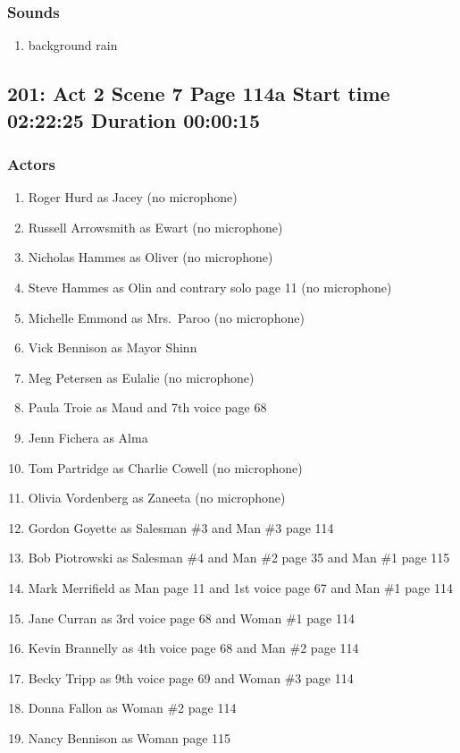 \subsubsection{Sounds}
\begin{enumerate}
\item background rain
\end{enumerate}
\subsection{201: Act 2 Scene 7 Page 114a Start time 02:22:25 Duration 00:00:15}

\subsubsection{Actors}
\begin{enumerate}
\item Roger Hurd as Jacey (no microphone)
\item Russell Arrowsmith as Ewart (no microphone)
\item Nicholas Hammes as Oliver (no microphone)
\item Steve Hammes as Olin and contrary solo page 11 (no microphone)
\item Michelle Emmond as Mrs.~Paroo (no microphone)
\item Vick Bennison as Mayor Shinn
\item Meg Petersen as Eulalie (no microphone)
\item Paula Troie as Maud and 7th voice page 68
\item Jenn Fichera as Alma
\item Tom Partridge as Charlie Cowell (no microphone)
\item Olivia Vordenberg as Zaneeta (no microphone)
\item Gordon Goyette as Salesman \#3 and Man \#3 page 114
\item Bob Piotrowski as Salesman \#4 and Man \#2 page 35 and Man \#1 page 115
\item Mark Merrifield as Man page 11 and 1st voice page 67 and Man \#1 page 114
\item Jane Curran as 3rd voice page 68 and Woman \#1 page 114
\item Kevin Brannelly as 4th voice page 68 and Man \#2 page 114
\item Becky Tripp as 9th voice page 69 and Woman \#3 page 114
\item Donna Fallon as Woman \#2 page 114
\item Nancy Bennison as Woman page 115
\end{enumerate}

